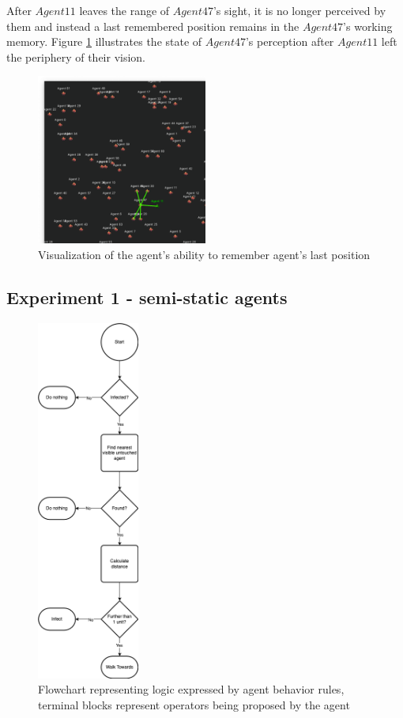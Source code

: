 After $Agent11$ leaves the range of $Agent47$'s sight, it is no longer perceived by them and instead a last remembered position remains in the $Agent47$'s working memory.
Figure \ref{fig:images/visibility/agent47_moved.png} illustrates the state of $Agent47$'s perception after $Agent11$ left the periphery of their vision.

\begin{figure}[H]
    \centering
    \includegraphics[width=0.5\textwidth]{images/visibility/agent47_moved.png}
    \caption{Visualization of the agent's ability to remember agent's last position}\label{fig:images/visibility/agent47_moved.png}
\end{figure}

\subsection{Experiment 1 - semi-static agents}

\begin{figure}[H]
    \centering
    \includegraphics[width=0.3\textwidth]{images/chapter2/sir_logic.drawio.png}
    \caption{Flowchart representing logic expressed by agent behavior rules, terminal blocks represent operators being proposed by the agent}\label{fig:sir_logic.drawio.png}
\end{figure}

